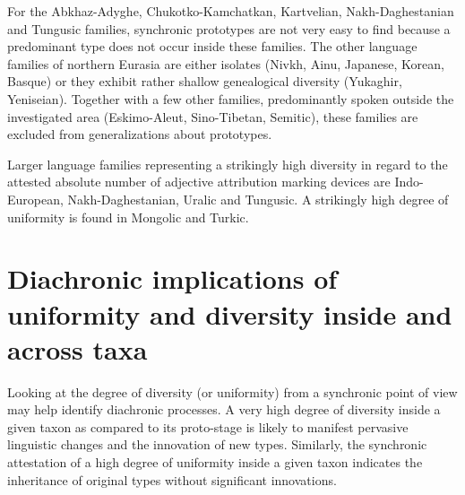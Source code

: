 For the Abkhaz-Adyghe, Chukotko-Kamchatkan, Kartvelian, Nakh\hyp{}Daghestanian and Tungusic families, synchronic prototypes are not very easy to find because a predominant type does not occur inside these families. The other language families of northern Eurasia are either isolates (Nivkh, Ainu, Japanese, Korean, Basque) or they exhibit rather shallow genealogical diversity (Yukaghir, Ye\-ni\-sei\-an). Together with a few other families, predominantly spoken outside the investigated area (Eskimo-Aleut, Sino-Tibetan, Semitic), these families are excluded from generalizations about prototypes. 

Larger language families representing a strikingly high diversity in regard to the attested absolute number of adjective attribution marking devices are Indo-European, Nakh\hyp{}Daghestanian, Uralic and Tungusic. A strikingly high degree of uniformity is found in Mongolic and Turkic.

\section[Diachronic implications]{Diachronic implications of uniformity and diversity inside and across taxa}
Looking at the degree of diversity (or uniformity) from a synchronic point of view may help identify diachronic processes. A very high degree of diversity inside a given taxon as compared to its proto-stage is likely to manifest pervasive linguistic changes and the innovation of new types. Similarly, the synchronic attestation of a high degree of uniformity inside a given taxon indicates the inheritance of original types without significant innovations. 


